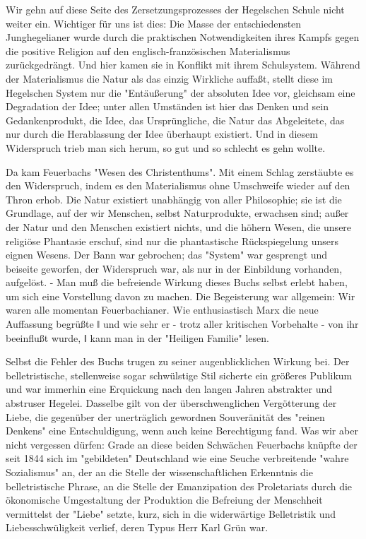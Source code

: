 Wir gehn auf diese Seite des Zersetzungsprozesses der Hegelschen
Schule nicht weiter ein. Wichtiger für uns ist dies: Die Masse der
entschiedensten Junghegelianer wurde durch die praktischen
Notwendigkeiten ihres Kampfs gegen die positive Religion auf den
englisch-französischen Materialismus zurückgedrängt. Und hier kamen sie
in Konflikt mit ihrem Schulsystem. Während der Materialismus die Natur
als das einzig Wirkliche auffaßt, stellt diese im Hegelschen System nur
die "Entäußerung" der absoluten Idee vor, gleichsam eine Degradation der
Idee; unter allen Umständen ist hier das Denken und sein
Gedankenprodukt, die Idee, das Ursprüngliche, die Natur das Abgeleitete,
das nur durch die Herablassung der Idee überhaupt existiert. Und in
diesem Widerspruch trieb man sich herum, so gut und so schlecht es gehn
wollte.

Da kam Feuerbachs "Wesen des Christenthums". Mit einem Schlag
zerstäubte es den Widerspruch, indem es den Materialismus ohne
Umschweife wieder auf den Thron erhob. Die Natur existiert unabhängig
von aller Philosophie; sie ist die Grundlage, auf der wir Menschen,
selbst Naturprodukte, erwachsen sind; außer der Natur und den Menschen
existiert nichts, und die höhern Wesen, die unsere religiöse Phantasie
erschuf, sind nur die phantastische Rückspiegelung unsers eignen Wesens.
Der Bann war gebrochen; das "System" war gesprengt und beiseite
geworfen, der Widerspruch war, als nur in der Einbildung vorhanden,
aufgelöst. - Man muß die befreiende Wirkung dieses Buchs selbst erlebt
haben, um sich eine Vorstellung davon zu machen. Die Begeisterung war
allgemein: Wir waren alle momentan Feuerbachianer. Wie enthusiastisch
Marx die neue Auffassung begrüßte ǁ und wie sehr er - trotz aller
kritischen Vorbehalte - von ihr beeinflußt wurde, ǁ kann man in
der "Heiligen Familie" lesen.

Selbst die Fehler des Buchs trugen zu seiner augenblicklichen
Wirkung bei. Der belletristische, stellenweise sogar schwülstige Stil
sicherte ein größeres Publikum und war immerhin eine Erquickung nach den
langen Jahren abstrakter und abstruser Hegelei. Dasselbe gilt von der
überschwenglichen Vergötterung der Liebe, die gegenüber der unerträglich
gewordnen Souveränität des "reinen Denkens" eine Entschuldigung, wenn
auch keine Berechtigung fand. Was wir aber nicht vergessen dürfen: Grade
an diese beiden Schwächen Feuerbachs knüpfte der seit 1844 sich im
"gebildeten" Deutschland wie eine Seuche verbreitende "wahre
Sozialismus" an, der an die Stelle der wissenschaftlichen Erkenntnis die
belletristische Phrase, an die Stelle der Emanzipation des Proletariats
durch die ökonomische Umgestaltung der Produktion die Befreiung der
Menschheit vermittelst der "Liebe" setzte, kurz, sich in die
widerwärtige Belletristik und Liebesschwüligkeit verlief, deren Typus
Herr Karl Grün war.


